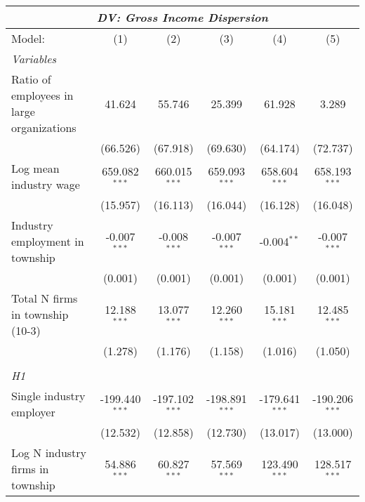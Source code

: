 \begingroup
\centering
\begin{tabular}{lccccc}
   \tabularnewline \multicolumn{6}{c}{\textit{DV: Gross Income Dispersion}} \\ \midrule \midrule
   Model:                                    & (1)              & (2)              & (3)              & (4)              & (5)\\  
   \midrule
   \emph{Variables}\\
   Ratio of employees in large organizations & 41.624           & 55.746           & 25.399           & 61.928           & 3.289\\   
                                             & (66.526)         & (67.918)         & (69.630)         & (64.174)         & (72.737)\\   
   Log mean industry wage                    & 659.082$^{***}$  & 660.015$^{***}$  & 659.093$^{***}$  & 658.604$^{***}$  & 658.193$^{***}$\\   
                                             & (15.957)         & (16.113)         & (16.044)         & (16.128)         & (16.048)\\   
   Industry employment in township           & -0.007$^{***}$   & -0.008$^{***}$   & -0.007$^{***}$   & -0.004$^{**}$    & -0.007$^{***}$\\   
                                             & (0.001)          & (0.001)          & (0.001)          & (0.001)          & (0.001)\\   
   Total N firms in township (10-3)          & 12.188$^{***}$   & 13.077$^{***}$   & 12.260$^{***}$   & 15.181$^{***}$   & 12.485$^{***}$\\   
                                             & (1.278)          & (1.176)          & (1.158)          & (1.016)          & (1.050)\\   
\hdashline %
\\[0.1ex] %
\emph{H1} \\ 
   Single industry employer                  & -199.440$^{***}$ & -197.102$^{***}$ & -198.891$^{***}$ & -179.641$^{***}$ & -190.206$^{***}$\\   
                                             & (12.532)         & (12.858)         & (12.730)         & (13.017)         & (13.000)\\   
   Log N industry firms in township          & 54.886$^{***}$   & 60.827$^{***}$   & 57.569$^{***}$   & 123.490$^{***}$  & 128.517$^{***}$\\   

\end{tabular}
